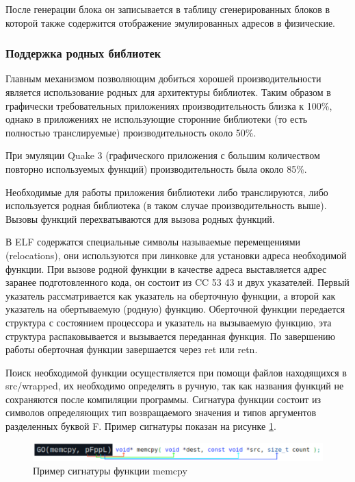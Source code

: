 После генерации блока он записывается в таблицу сгенерированных блоков в которой также содержится отображение эмулированных адресов в физические. \cite{box64_wide}

\subsubsection{Поддержка родных библиотек}

Главным механизмом позволяющим добиться хорошей производительности является использование родных для архитектуры библиотек. Таким образом в графически требовательных приложениях производительность близка к 100\%, однако в приложениях не использующие сторонние библиотеки (то есть полностью транслируемые) производительность около 50\%.

При эмуляции Quake 3 (графического приложения с большим количеством повторно используемых функций) производительность была около 85\%.

Необходимые для работы приложения библиотеки либо транслируются, либо используется родная библиотека (в таком случае производительность выше). Вызовы функций перехватываются для вызова родных функций. 

В ELF содержатся специальные символы называемые перемещениями (relocations), они используются при линковке для установки адреса необходимой функции. При вызове родной функции в качестве адреса выставляется адрес заранее подготовленного кода, он состоит из CC 53 43 и двух указателей. Первый указатель рассматривается как указатель на оберточную функции, а второй как указатель на обертываемую (родную) функцию. Оберточной функции передается структура с состоянием процессора и указатель на вызываемую функцию, эта структура распаковывается и вызывается переданная функция. По завершению работы оберточная функции завершается через ret или retn.

Поиск необходимой функции осуществляется при помощи файлов находящихся в src/wrapped, их необходимо определять в ручную, так как названия функций не сохраняются после компиляции программы. Сигнатура функции состоит из символов определяющих тип возвращаемого значения и типов аргументов разделенных буквой F. Пример сигнатуры показан на рисунке \ref{fig:box64sig}.

\begin{figure}[hbtp]
	\centering
	\includegraphics[width=\textwidth]{img/box64_sig.png}
	\caption{Пример сигнатуры функции memcpy}
	\label{fig:box64sig}
\end{figure}

